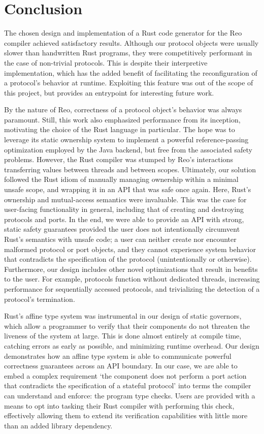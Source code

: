 \section{Conclusion}

The chosen design and implementation of a Rust code generator for the Reo compiler achieved satisfactory results. Although our protocol objects were usually slower than handwritten Rust programs, they were competitively performant in the case of non-trivial protocols. This is despite their interpretive implementation, which has the added benefit of facilitating the reconfiguration of a protocol's behavior at runtime. Exploiting this feature was out of the scope of this project, but provides an entrypoint for interesting future work.

By the nature of Reo, correctness of a protocol object's behavior was always paramount. Still, this work also emphasized performance from its inception, motivating the choice of the Rust language in particular. The hope was to leverage its static ownership system to implement a powerful reference-passing optimization employed by the Java backend, but free from the associated safety problems. However, the Rust compiler was stumped by Reo's interactions transferring values between threads and between scopes. Ultimately, our solution followed the Rust idiom of manually managing ownership within a minimal unsafe scope, and wrapping it in an API that was safe once again. Here, Rust's ownership and mutual-access semantics were invaluable. This was the case for user-facing functionality in general, including that of creating and destroying protocols and ports. In the end, we were able to provide an API with strong, static safety guarantees provided the user does not intentionally circumvent Rust's semantics with unsafe code; a user can neither create nor encounter malformed protocol or port objects, and they cannot experience system behavior that contradicts the specification of the protocol (unintentionally or otherwise). Furthermore, our design includes other novel optimizations that result in benefits to the user. For example, protocols function without dedicated threads, increasing performance for sequentially accessed protocols, and trivializing the detection of a protocol's termination.

Rust's affine type system was instrumental in our design of static governors, which allow a programmer to verify that their components do not threaten the liveness of the system at large. This is done almost entirely at compile time, catching errors as early as possible, and minimizing runtime overhead. Our design demonstrates how an affine type system is able to communicate powerful correctness guarantees across an API boundary. In our case, we are able to embed a complex requirement `the component does not perform a port action that contradicts the specification of a stateful protocol' into terms the compiler can understand and enforce: the program type checks. Users are provided with a means to opt into tasking their Rust compiler with performing this check, effectively allowing them to extend its verification capabilities with little more than an added library dependency. 


